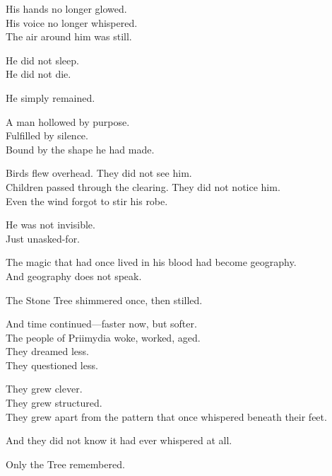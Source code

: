 \documentclass[9pt]{article}
\begin{document}
\vspace{0.5em}
His hands no longer glowed.\\
His voice no longer whispered.\\
The air around him was still.

\vspace{0.5em}
He did not sleep.\\
He did not die.

\vspace{0.5em}
He simply remained.

\vspace{0.5em}
A man hollowed by purpose.\\
Fulfilled by silence.\\
Bound by the shape he had made.

\vspace{0.5em}
Birds flew overhead. They did not see him.\\
Children passed through the clearing. They did not notice him.\\
Even the wind forgot to stir his robe.

\vspace{0.5em}
He was not invisible.\\
Just unasked-for.

\vspace{0.5em}
The magic that had once lived in his blood had become geography.\\
And geography does not speak.

\vspace{0.5em}
The Stone Tree shimmered once, then stilled.

\vspace{0.5em}
And time continued---faster now, but softer.\\
The people of Priimydia woke, worked, aged.\\
They dreamed less.\\
They questioned less.

\vspace{0.5em}
They grew clever.\\
They grew structured.\\
They grew apart from the pattern that once whispered beneath their feet.

\vspace{0.5em}
And they did not know it had ever whispered at all.

\vspace{0.5em}
Only the Tree remembered.
\end{document}
